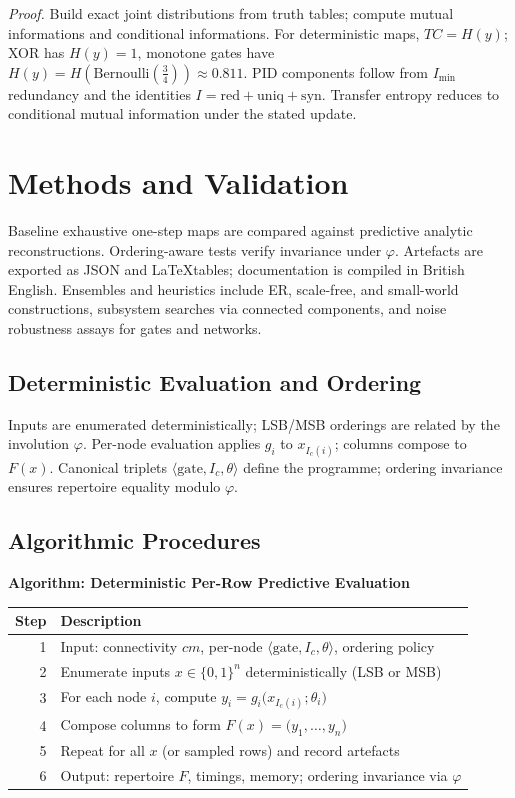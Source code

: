 \documentclass[11pt]{article}
\begin{document}
\emph{Proof.} Build exact joint distributions from truth tables; compute mutual informations and conditional informations. For deterministic maps, $TC=H(y)$; XOR has $H(y)=1$, monotone gates have $H(y)=H(\mathrm{Bernoulli}(\tfrac{3}{4}))\approx 0.811$. PID components follow from $I_{\min}$ redundancy and the identities $I=\mathrm{red}+\mathrm{uniq}+\mathrm{syn}$. Transfer entropy reduces to conditional mutual information under the stated update.

\section{Methods and Validation}
Baseline exhaustive one-step maps are compared against predictive analytic reconstructions. Ordering-aware tests verify invariance under $\varphi$. Artefacts are exported as JSON and \LaTeX tables; documentation is compiled in British English. Ensembles and heuristics include ER, scale-free, and small-world constructions, subsystem searches via connected components, and noise robustness assays for gates and networks.

\subsection{Deterministic Evaluation and Ordering}
Inputs are enumerated deterministically; LSB/MSB orderings are related by the involution $\varphi$. Per-node evaluation applies $g_i$ to $x_{I_c(i)}$; columns compose to $F(x)$. Canonical triplets $\langle\text{gate}, I_c, \theta\rangle$ define the programme; ordering invariance ensures repertoire equality modulo $\varphi$.

\subsection{Algorithmic Procedures}
\textbf{Algorithm: Deterministic Per-Row Predictive Evaluation}\\
\begin{center}
\begin{tabular}{rl}
\hline
Step & Description \\
\hline
1 & Input: connectivity $cm$, per-node $\langle\text{gate}, I_c, \theta\rangle$, ordering policy \\
2 & Enumerate inputs $x\in\{0,1\}^n$ deterministically (LSB or MSB) \\
3 & For each node $i$, compute $y_i=g_i\big(x_{I_c(i)};\theta_i\big)$ \\
4 & Compose columns to form $F(x)=\big(y_1,\dots,y_n\big)$ \\
5 & Repeat for all $x$ (or sampled rows) and record artefacts \\
6 & Output: repertoire $F$, timings, memory; ordering invariance via $\varphi$ \\
\hline
\end{tabular}
\end{center}
\end{document}
